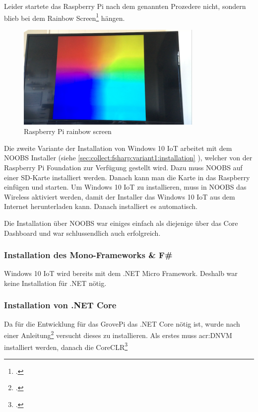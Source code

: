 Leider startete das Raspberry Pi nach dem genannten Prozedere nicht, sondern blieb bei dem Rainbow Screen\footcite{RPi_Rainbowscreen_2016-04-25} hängen.

\begin{figure}[H]
  \centering
  \includegraphics[width=0.8\textwidth]{./images/raspberry-rainbow-screen.png}
  \caption{Raspberry Pi rainbow screen}
\end{figure}

Die zweite Variante der Installation von Windows 10 IoT arbeitet mit dem NOOBS Installer (siehe \ref{sec:collect:fsharp:variant1:installation} ), welcher von der Raspberry Pi Foundation zur Verfügung gestellt wird. Dazu muss NOOBS auf einer SD-Karte installiert werden. Danach kann man die Karte in das Raspberry einfügen und starten. Um Windows 10 IoT zu installieren, muss in NOOBS das Wireless aktiviert werden, damit der Installer das Windows 10 IoT aus dem Internet herunterladen kann. Danach installiert es automatisch.

Die Installation über NOOBS war einiges einfach als diejenige über das Core Dashboard und war schlussendlich auch erfolgreich.

\subsubsection{Installation des Mono-Frameworks \& F\#}
Windows 10 IoT wird bereits mit dem .NET Micro Framework. Deshalb war keine Installation für .NET nötig.

\subsubsection{Installation von .NET Core}
Da für die Entwicklung für das GrovePi das .NET Core nötig ist, wurde nach einer Anleitung\footcite{How_to_run_DotNET_Core_Application_on_Pi2} versucht dieses zu installieren. Als erstes muss \gls{acr:DNVM} installiert werden, danach die CoreCLR\footcite{CoreCLR_2016-06-17}

